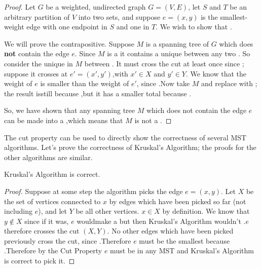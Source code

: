 \documentclass{tufte-handout}
\begin{document}
\begin{proof}
  Let $G$ be a weighted, undirected graph $G = (V,E)$, let $S$ and $T$
  be an arbitrary partition of $V$ into two sets, and suppose
  $e = (x,y)$ is the smallest-weight edge with one endpoint in $S$ and
  one in $T$.  We wish to show that \blank.

  We will prove the contrapositive. Suppose $M$ is a spanning tree of
  $G$ which does \textbf{not} contain the edge $e$.  Since $M$ is a
  \blank it contains a unique \blank\linebreak between any two
  \blank. So consider the unique \blank\linebreak in $M$ between
  \blank.   It must cross the
  cut at least once since\linebreak \mbox{} \blank; suppose it crosses
  at $e' = (x',y')$,\linebreak with $x' \in X$ and $y' \in Y$.  We
  know that the weight of $e$ is smaller than the weight of $e'$,
  since \blank.\linebreak Now take $M$ and replace \blank with \blank;
  the result is\linebreak still \blank because
  \blank,\linebreak but it has a smaller total \blank because \blank.

  So, we have shown that any spanning tree $M$ which does not contain
  the edge $e$ can be made into a \blank,\linebreak which means that
  $M$ is not a \blank.
\end{proof}

The cut property can be used to directly show the correctness of
several MST algorithms.  Let's prove the correctness of Kruskal's
Algorithm; the proofs for the other algorithms are similar.

\begin{thm}
  Kruskal's Algorithm is correct.
\end{thm}

\begin{proof}
  Suppose at some step the algorithm picks the edge $e = (x,y)$.  Let
  $X$ be the set of vertices connected to $x$ by edges which have been
  picked so far (not including $e$), and let $Y$ be all other
  vertices. $x \in X$ by definition.  We know that $y \notin X$ since
  if it was, $e$ would\linebreak make a \blank but then Kruskal's
  Algorithm wouldn't \blank.\linebreak $e$ therefore crosses the cut
  $(X,Y)$. No other edges which have been picked previously cross the
  cut, since \blank.\linebreak Therefore $e$ must be the smallest
  \blank\linebreak because \blank.\linebreak Therefore by the Cut
  Property $e$ must be in any MST and Kruskal's Algorithm is correct
  to pick it.
\end{proof}
\end{document}
